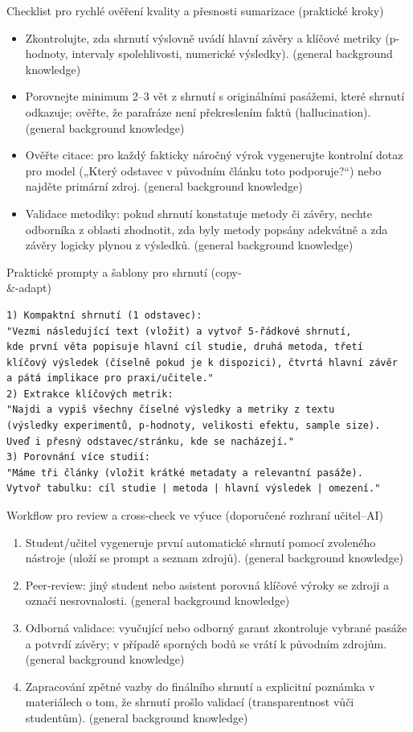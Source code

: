 \documentclass{report}%
\begin{document}
Checklist pro rychlé ověření kvality a přesnosti sumarizace (praktické kroky)
\begin{itemize}
  \item Zkontrolujte, zda shrnutí výslovně uvádí hlavní závěry a klíčové metriky (p-hodnoty, intervaly spolehlivosti, numerické výsledky). (general background knowledge)
  \item Porovnejte minimum 2–3 vět z shrnutí s originálními pasážemi, které shrnutí odkazuje; ověřte, že parafráze není překreslením faktů (hallucination). (general background knowledge)
  \item Ověřte citace: pro každý fakticky náročný výrok vygenerujte kontrolní dotaz pro model („Který odstavec v původním článku toto podporuje?“) nebo najděte primární zdroj. (general background knowledge)
  \item Validace metodiky: pokud shrnutí konstatuje metody či závěry, nechte odborníka z oblasti zhodnotit, zda byly metody popsány adekvátně a zda závěry logicky plynou z výsledků. (general background knowledge)
\end{itemize}

Praktické prompty a šablony pro shrnutí (copy-\\ \&-adapt)
\begin{verbatim}
1) Kompaktní shrnutí (1 odstavec):
"Vezmi následující text (vložit) a vytvoř 5-řádkové shrnutí,
kde první věta popisuje hlavní cíl studie, druhá metoda, třetí
klíčový výsledek (číselně pokud je k dispozici), čtvrtá hlavní závěr
a pátá implikace pro praxi/učitele."
2) Extrakce klíčových metrik:
"Najdi a vypiš všechny číselné výsledky a metriky z textu
(výsledky experimentů, p-hodnoty, velikosti efektu, sample size).
Uveď i přesný odstavec/stránku, kde se nacházejí."
3) Porovnání více studií:
"Máme tři články (vložit krátké metadaty a relevantní pasáže).
Vytvoř tabulku: cíl studie | metoda | hlavní výsledek | omezení."
\end{verbatim}

Workflow pro review a cross‑check ve výuce (doporučené rozhraní učitel–AI)
\begin{enumerate}
  \item Student/učitel vygeneruje první automatické shrnutí pomocí zvoleného nástroje (uloží se prompt a seznam zdrojů). (general background knowledge)
  \item Peer‑review: jiný student nebo asistent porovná klíčové výroky se zdroji a označí nesrovnalosti. (general background knowledge)
  \item Odborná validace: vyučující nebo odborný garant zkontroluje vybrané pasáže a potvrdí závěry; v případě sporných bodů se vrátí k původním zdrojům. (general background knowledge)
  \item Zapracování zpětné vazby do finálního shrnutí a explicitní poznámka v materiálech o tom, že shrnutí prošlo validací (transparentnost vůči studentům). (general background knowledge)
\end{enumerate}
\end{document}
